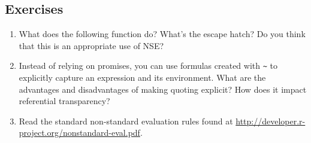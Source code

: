 \hypertarget{exercises-5}{%
\subsection{Exercises}\label{exercises-5}}

\begin{enumerate}
\def\labelenumi{\arabic{enumi}.}
\item
  What does the following function do? What's the escape hatch? Do you
  think that this is an appropriate use of NSE?

\begin{Shaded}
\begin{Highlighting}[]
\StringTok{ }
\StringTok{ }
  \NormalTok{())}
\NormalTok{\}}
\end{Highlighting}
\end{Shaded}
\item
  Instead of relying on promises, you can use formulas created with
  \texttt{\textasciitilde{}} to explicitly capture an expression and its
  environment. What are the advantages and disadvantages of making
  quoting explicit? How does it impact referential transparency?
\item
  Read the standard non-standard evaluation rules found at
  \url{http://developer.r-project.org/nonstandard-eval.pdf}.
\end{enumerate}
